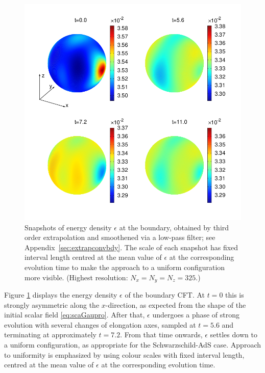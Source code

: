 \documentclass[a4paper,11pt]{article}
\numberwithin{equation}{section}
\begin{document}
\begin{figure}[!h]
        \centering
        \includegraphics[width=5.0in,clip=true]{plots/bdyplots/L3/bdyenergydensity/sphereplots_bdyenergydensity_L3_2by2.png}
\parbox{5.0in}{\caption{Snapshots of energy density $\epsilon$ at the boundary, obtained by third order extrapolation and smoothened via a low-pass filter;
see Appendix~\ref{sec:extrapconvbdy}. The scale of each snapshot has fixed interval length centred at the mean value of  $\epsilon$ at the corresponding evolution time to make the approach to a uniform configuration more visible. (Highest resolution: $N_x=N_y=N_z=325$.)
        }\label{fig:snapshotsenergydensity}}
\end{figure}

Figure \ref{fig:snapshotsenergydensity} displays the energy density $\epsilon$ of the boundary CFT.
At $t=0$ this is strongly asymmetric along the $x$-direction, as expected from the shape of the initial scalar field \eqref{eq:scaGaupro}. 
After that, $\epsilon$ undergoes a phase of strong evolution with several changes of elongation axes, sampled at $t=5.6$ and terminating at approximately $t=7.2$. From that time onwards, $\epsilon$ settles down to a uniform configuration, as appropriate for the Schwarzschild-AdS case. Approach to uniformity is emphasized by using colour scales with fixed interval length, centred at the mean value of $\epsilon$ at the corresponding evolution time.
\end{document}
